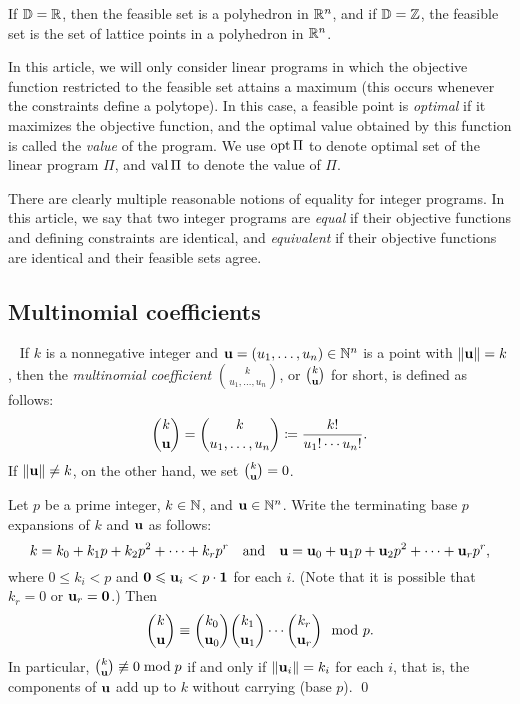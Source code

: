 \documentclass[11pt]{amsart}
\begin{document}
If $\mathbb{D} = \mathbb{R}$, then the feasible set is a polyhedron in $\mathbb{R}^n$, and if $\mathbb{D} = \mathbb{Z}$, the feasible set is the set of lattice points in a polyhedron in $\mathbb{R}^n$.  

In this article, we will only consider linear programs in which the objective function restricted to the feasible set attains a maximum (\eg this occurs whenever the constraints define a polytope).
In this case, a feasible point is \emph{optimal} if it maximizes the objective function, and the optimal value obtained by this function is called the \emph{value} of the program.
We use $\operatorname{opt} \Pi$ to denote optimal set of the linear program $\Pi$, and $\operatorname{val} \Pi$ to denote the value of $\Pi$. 

There are clearly multiple reasonable notions of equality for integer programs.
In this article,  we say that two integer programs are \emph{equal} if their objective functions and defining constraints are identical, and \emph{equivalent} if their objective functions are identical and their feasible sets agree. 

\subsection{Multinomial coefficients}
\ 
If $k$ is a nonnegative integer and $\mathbf{u} = (u_1,\ldots,u_n) \in \mathbb{N}^n$ is a point with $\| \mathbf{u} \| = k$, then the \emph{multinomial coefficient} $\binom{k}{u_1,\ldots,u_n}$, or $\binom{k}{\mathbf{u}}$ for short, is defined as follows: 
\[
   \binom{k}{\mathbf{u}} = \binom{k}{u_1,\ldots,u_n} \coloneqq \frac{k!}{u_1!\cdots u_n!}.
\]
If $\| \mathbf{u} \| \ne k$, on the other hand, we set $\binom{k}{\mathbf{u}}=0$.
	
\begin{theorem}
   \label{thm: dickson}
   Let $p$ be a prime integer, $k\in \mathbb{N}$, and $\mathbf{u} \in \mathbb{N}^n$.
   Write the terminating base $p$ expansions of $k$ and $\mathbf{u}$ as follows\textup:
   \begin{equation*}
      k = k_0+k_1p+k_2p^2+\cdots+k_rp^r\quad \text{and} \quad \mathbf{u}=\mathbf{u}_0+\mathbf{u}_1p+\mathbf{u}_2p^2+\cdots+\mathbf{u}_rp^r,
   \end{equation*}
   where $0\le k_i < p$ and $\mathbf{0}\leqslant\mathbf{u}_i < p \cdot \mathbf{1}$ for each $i$.
   \textup{(}Note that it is possible that $k_r = 0$ or $\mathbf{u}_r = \mathbf{0}$.\textup{)}
   Then
   \[
      \binom{k}{\mathbf{u}}\equiv \binom{k_0}{\mathbf{u}_0}\binom{k_1}{\mathbf{u}_1}\cdots \binom{k_r}{\mathbf{u}_r} \mod{p}.
   \]
   In particular, $\binom{k}{\mathbf{u}}\not\equiv 0\bmod{p}$ if and only if $\| \mathbf{u}_i \|=k_i$ for each $i$, that is, the components of $\mathbf{u}$ add up to $k$ without carrying \textup(base $p$\textup).
\qed
\end{theorem}
\end{document}
